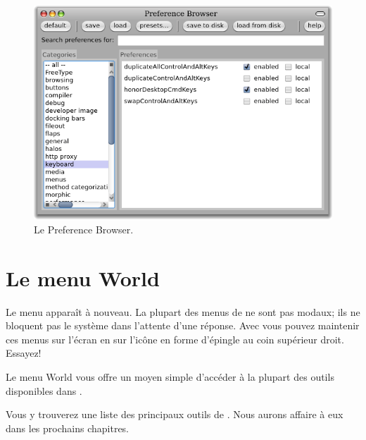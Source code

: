 \documentclass[a4paper,10pt,twoside]{book}
\begin{document}
\begin{figure}[htb]
	{\centerline {\includegraphics[width=\textwidth]{PreferenceBrowser}}}
\caption{Le Preference Browser.}
\end{figure}

\section{Le menu World}

Le menu  apparaît à nouveau.
La plupart des menus de \pharo ne sont pas modaux; ils ne bloquent pas
le système dans l'attente d'une réponse.
Avec \pharo vous pouvez maintenir ces menus sur l'écran en \clickant{} sur
l'icône en forme d'épingle au coin supérieur droit. Essayez!%

Le menu World vous offre un moyen simple d'accéder à la plupart des
outils disponibles dans \pharo.


Vous y trouverez une liste des principaux outils de \pharo.
Nous aurons affaire à eux dans les prochains chapitres.
\end{document}
